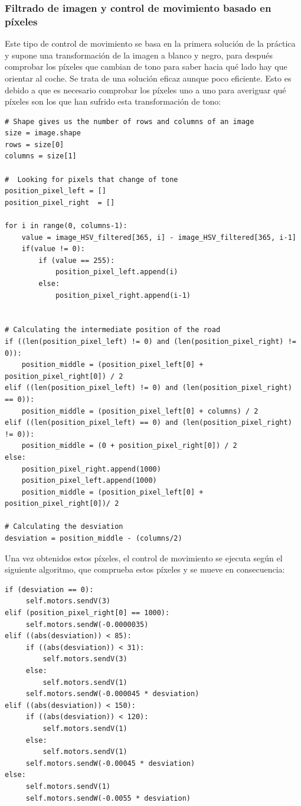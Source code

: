 \subsubsection{Filtrado de imagen y control de movimiento basado en píxeles} \label{subsec.ficmbp}
Este tipo de control de movimiento se basa en la primera solución de la práctica y supone una transformación de la imagen a blanco y negro, para después comprobar los píxeles que cambian de tono para saber hacia qué lado hay que orientar al coche.
Se trata de una solución eficaz aunque poco eficiente. Esto es debido a que es necesario comprobar los píxeles uno a uno para averiguar qué píxeles son los que han sufrido esta transformación de tono:

\lstset{language=Python, breaklines=true, basicstyle=\footnotesize}
\begin{lstlisting}[frame=single]
# Shape gives us the number of rows and columns of an image
size = image.shape
rows = size[0]
columns = size[1]

#  Looking for pixels that change of tone
position_pixel_left = []
position_pixel_right  = []

for i in range(0, columns-1):
    value = image_HSV_filtered[365, i] - image_HSV_filtered[365, i-1]
    if(value != 0):
        if (value == 255):
            position_pixel_left.append(i)
        else:
            position_pixel_right.append(i-1)


# Calculating the intermediate position of the road
if ((len(position_pixel_left) != 0) and (len(position_pixel_right) != 0)):
    position_middle = (position_pixel_left[0] + position_pixel_right[0]) / 2
elif ((len(position_pixel_left) != 0) and (len(position_pixel_right) == 0)):
    position_middle = (position_pixel_left[0] + columns) / 2
elif ((len(position_pixel_left) == 0) and (len(position_pixel_right) != 0)):
    position_middle = (0 + position_pixel_right[0]) / 2
else:
    position_pixel_right.append(1000)
    position_pixel_left.append(1000)
    position_middle = (position_pixel_left[0] + position_pixel_right[0])/ 2

# Calculating the desviation
desviation = position_middle - (columns/2)
\end{lstlisting}

Una vez obtenidos estos píxeles, el control de movimiento se ejecuta según el siguiente algoritmo, que comprueba estos píxeles y se mueve en consecuencia:

\lstset{language=Python, breaklines=true, basicstyle=\footnotesize}
\begin{lstlisting}[frame=single]
if (desviation == 0):
     self.motors.sendV(3)
elif (position_pixel_right[0] == 1000):
     self.motors.sendW(-0.0000035)
elif ((abs(desviation)) < 85):
     if ((abs(desviation)) < 31):
         self.motors.sendV(3)
     else:
         self.motors.sendV(1)
     self.motors.sendW(-0.000045 * desviation)
elif ((abs(desviation)) < 150):
     if ((abs(desviation)) < 120):
         self.motors.sendV(1)
     else:
         self.motors.sendV(1)
     self.motors.sendW(-0.00045 * desviation)
else:
     self.motors.sendV(1)
     self.motors.sendW(-0.0055 * desviation)
\end{lstlisting}

